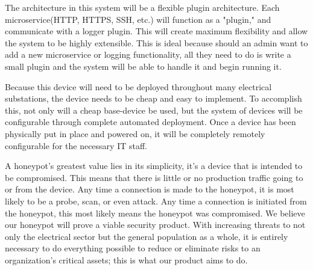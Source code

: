 The architecture in this system will be a flexible plugin architecture. Each microservice(HTTP, HTTPS, SSH, etc.) will function as a "plugin," and communicate with a logger plugin. This will create maximum flexibility and allow the system to be highly extensible. This is ideal because should an admin want to add a new microservice or logging functionality, all they need to do is write a small plugin and the system will be able to handle it and begin running it.

Because this device will need to be deployed throughout many electrical substations, the device needs to be cheap and easy to implement. To accomplish this, not only will a cheap base-device be used, but the system of devices will be configurable through complete automated deployment. Once a device has been physically put in place and powered on, it will be completely remotely configurable for the necessary IT staff.

A honeypot's greatest value lies in its simplicity, it's a device that is intended to be compromised. This means that there is little or no production traffic going to or from the device. Any time a connection is made to the honeypot, it is most likely to be a probe, scan, or even attack. Any time a connection is initiated from the honeypot, this most likely means the honeypot was compromised. We believe our honeypot will prove a viable security product. With increasing threats to not only the electrical sector but the general population as a whole, it is entirely necessary to do everything possible to reduce or eliminate risks to an organization's critical assets; this is what our product aims to do.